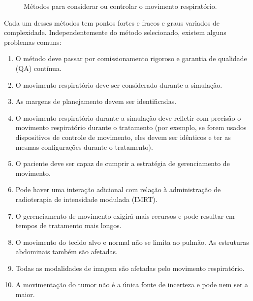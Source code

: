 \documentclass[11pt,a4paper]{article}
\newcounter{exemplo}
\begin{document}
	\begin{figure}[h]
		\centering
		\caption{Métodos para considerar ou controlar o movimento respiratório.}
		\label{fig:tecnicasRespiratorio}
	\end{figure}

	Cada um desses métodos tem pontos fortes e fracos e graus variados de complexidade. Independentemente do método selecionado, existem alguns problemas comuns:

	\begin{enumerate}[label=\textcolor{CarnationPink}{(\roman*)}]
		\item O método deve passar por comissionamento rigoroso e garantia de qualidade (QA) contínua.
		\item O movimento respiratório deve ser considerado durante a simulação.
		\item As margens de planejamento devem ser identificadas.
		\item O movimento respiratório durante a simulação deve refletir com precisão o movimento respiratório durante o tratamento (por exemplo, se forem usados dispositivos de controle de movimento, eles devem ser idênticos e ter as mesmas configurações durante o tratamento).
		\item O paciente deve ser capaz de cumprir a estratégia de gerenciamento de movimento.
		\item Pode haver uma interação adicional com relação à administração de radioterapia de intensidade modulada (IMRT).
		\item O gerenciamento de movimento exigirá mais recursos e pode resultar em tempos de tratamento mais longos.
		\item O movimento do tecido alvo e normal não se limita ao pulmão. As estruturas abdominais também são afetadas.
		\item Todas as modalidades de imagem são afetadas pelo movimento respiratório.
		\item A movimentação do tumor não é a única fonte de incerteza e pode nem ser a maior.
	\end{enumerate}
\end{document}
